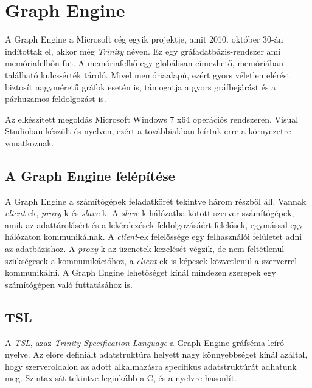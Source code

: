 \chapter{Graph Engine}

A Graph Engine a Microsoft cég egyik projektje, amit 2010. október 30-án indítottak el, akkor még \emph{Trinity} néven. Ez egy gráfadatbázis-rendszer ami memóriafelhőn fut. A memóriafelhő egy globálisan címezhető, memóriában található kulcs-érték tároló. Mivel memóriaalapú, ezért gyors véletlen elérést biztosít nagyméretű gráfok esetén is, támogatja a gyors gráfbejárást és a párhuzamos feldolgozást is.

Az elkészített megoldás Microsoft Windows 7 x64 operációs rendszeren, Visual Studioban készült és \Csh{} nyelven, ezért a továbbiakban leírtak erre a környezetre vonatkoznak.


\section{A Graph Engine felépítése}

A Graph Engine a számítógépek feladatkörét tekintve három részből áll. Vannak \emph{client}-ek, \emph{proxy}-k és \emph{slave}-k. A \emph{slave}-k hálózatba kötött szerver számítógépek, amik az adattárolásért és a lekérdezések feldolgozásáért felelősek, egymással egy hálózaton kommunikálnak. A \emph{client}-ek felelőssége egy felhasználói felületet adni az adatbázishoz. A \emph{proxy}-k az üzenetek kezelését végzik, de nem feltétlenül szükségesek a kommunikációhoz, a \emph{client}-ek is képesek közvetlenül a szerverrel kommunikálni. A Graph Engine lehetőséget kínál mindezen szerepek egy számítógépen való futtatásához is.


\section{TSL}

A \emph{TSL}, azaz \emph{Trinity Specification Language} a Graph Engine gráfséma-leíró nyelve. Az előre definiált adatstruktúra helyett nagy könnyebbséget kínál azáltal, hogy szerveroldalon az adott alkalmazásra specifikus adatstruktúrát adhatunk meg. Szintaxisát tekintve leginkább a C, \cpp{}  és a \Csh{} nyelvre hasonlít.

